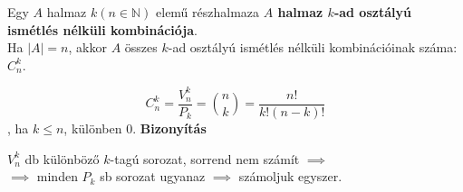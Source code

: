 \begin{frame}
  \begin{tcolorbox}[title={Def.: Ismétlés nélküli Kombináció}]
    Egy $A$ halmaz $k (n \in \mathbb{N})$ elemű részhalmaza \textbf{$A$ halmaz  $k$-ad osztályú ismétlés nélküli kombinációja}.\\
    Ha $|A| = n$, akkor $A$ összes $k$-ad osztályú ismétlés nélküli kombinációinak száma: $C_n^k$.
  \end{tcolorbox}

  \begin{tcolorbox}[title={Tétel: Kombinációk száma}]
    $$C_n^k = \frac{V_n^k}{P_k} = {{n}\choose{k}} = \frac{n!}{k!(n - k)!} $$, ha $k \leq n$, különben $0$.
  \tcblower
    \textbf{Bizonyítás}\\
    \mmedskip

    $V_n^k$ db különböző $k$-tagú sorozat, sorrend nem számít $\implies$\\
    $\implies$ minden $P_k$ sb sorozat ugyanaz $\implies$ számoljuk egyszer.\\
  \end{tcolorbox}
\end{frame}

